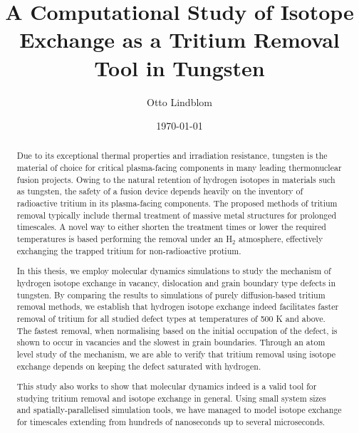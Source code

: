 \documentclass[english,twoside,openright]{HYgradu}
\title{A Computational Study of Isotope Exchange as a Tritium Removal Tool in Tungsten}
\author{Otto Lindblom}
\date{\today}
\begin{document}
\maketitle


\begin{abstract}
Due to its exceptional thermal properties and irradiation resistance, tungsten is the material of choice for critical plasma-facing components in many leading thermonuclear fusion projects.
Owing to the natural retention of hydrogen isotopes in materials such as tungsten, the safety of a fusion device depends heavily on the inventory of radioactive tritium in its plasma-facing components. 
The proposed methods of tritium removal typically include thermal treatment of massive metal structures for prolonged timescales.
A novel way to either shorten the treatment times or lower the required temperatures is based performing the removal under an H$_2$ atmosphere, effectively exchanging the trapped tritium for non-radioactive protium. 

In this thesis, we employ molecular dynamics simulations to study the mechanism of hydrogen isotope exchange in vacancy, dislocation and grain boundary type defects in tungsten.
By comparing the results to simulations of purely diffusion-based tritium removal methods, we establish that hydrogen isotope exchange indeed facilitates faster removal of tritium for all studied defect types at temperatures of 500 K and above.
The fastest removal, when normalising based on the initial occupation of the defect, is shown to occur in vacancies and the slowest in grain boundaries.   
Through an atom level study of the mechanism, we are able to verify that tritium removal using isotope exchange depends on keeping the defect saturated with hydrogen.

This study also works to show that molecular dynamics indeed is a valid tool for studying tritium removal and isotope exchange in general. 
Using small system sizes and spatially-parallelised simulation tools, we have managed to model isotope exchange for timescales extending from hundreds of nanoseconds up to several microseconds.
\end{abstract}
\end{document}
